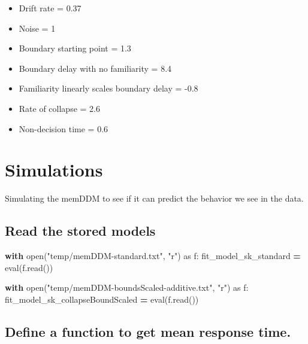 \documentclass[
]{book}
\newenvironment{Shaded}{\begin{snugshade}}{\end{snugshade}}
\newcommand{\BuiltInTok}[1]{#1}
\newcommand{\ControlFlowTok}[1]{\textcolor[rgb]{0.13,0.29,0.53}{\textbf{#1}}}
\newcommand{\ImportTok}[1]{#1}
\newcommand{\NormalTok}[1]{#1}
\newcommand{\OperatorTok}[1]{\textcolor[rgb]{0.81,0.36,0.00}{\textbf{#1}}}
\newcommand{\StringTok}[1]{\textcolor[rgb]{0.31,0.60,0.02}{#1}}
\providecommand{\tightlist}{%
  \setlength{\itemsep}{0pt}\setlength{\parskip}{0pt}}
\begin{document}
\begin{itemize}
\tightlist
\item
  Drift rate = 0.37
\item
  Noise = 1
\item
  Boundary starting point = 1.3
\item
  Boundary delay with no familiarity = 8.4
\item
  Familiarity linearly scales boundary delay = -0.8
\item
  Rate of collapse = 2.6
\item
  Non-decision time = 0.6
\end{itemize}

\hypertarget{simulations}{%
\section{Simulations}\label{simulations}}

Simulating the memDDM to see if it can predict the behavior we see in the data.

\hypertarget{read-the-stored-models}{%
\subsection{Read the stored models}\label{read-the-stored-models}}

\begin{Shaded}
\begin{Highlighting}[]
\ControlFlowTok{with} \BuiltInTok{open}\NormalTok{(}\StringTok{"temp/memDDM{-}standard.txt"}\NormalTok{, }\StringTok{"r"}\NormalTok{) }\ImportTok{as}\NormalTok{ f:}
\NormalTok{    fit\_model\_sk\_standard }\OperatorTok{=} \BuiltInTok{eval}\NormalTok{(f.read())}

\ControlFlowTok{with} \BuiltInTok{open}\NormalTok{(}\StringTok{"temp/memDDM{-}boundsScaled{-}additive.txt"}\NormalTok{, }\StringTok{"r"}\NormalTok{) }\ImportTok{as}\NormalTok{ f:}
\NormalTok{    fit\_model\_sk\_collapseBoundScaled }\OperatorTok{=} \BuiltInTok{eval}\NormalTok{(f.read())}
\end{Highlighting}
\end{Shaded}

\hypertarget{define-a-function-to-get-mean-response-time.}{%
\subsection{Define a function to get mean response time.}\label{define-a-function-to-get-mean-response-time.}}
\end{document}
